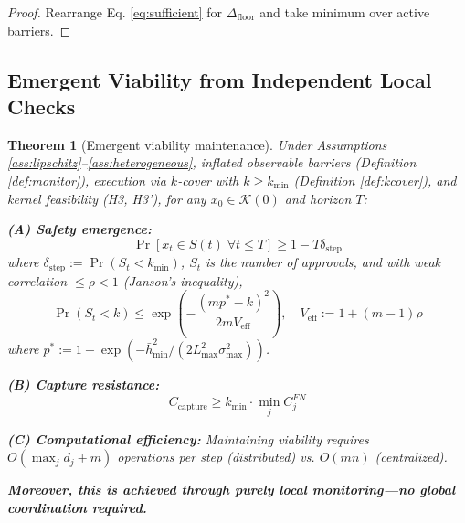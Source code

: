 \documentclass[11pt,a4paper]{article}
\newtheorem{theorem}{Theorem}[section]
\theoremstyle{definition}
\newcommand{\K}{\mathcal{K}}
\begin{document}
\begin{proof}
Rearrange Eq. \eqref{eq:sufficient} for $\Delta_{\text{floor}}$ and take minimum over active barriers.
\end{proof}

\subsection{Emergent Viability from Independent Local Checks}

\begin{theorem}[Emergent viability maintenance]\label{thm:emergence}
Under Assumptions \ref{ass:lipschitz}--\ref{ass:heterogeneous}, inflated observable barriers (Definition \ref{def:monitor}), execution via $k$-cover with $k \geq k_{\min}$ (Definition \ref{def:kcover}), and kernel feasibility (H3, H3'), for any $x_0 \in \K(0)$ and horizon $T$:

\textbf{(A) Safety emergence:}
\begin{equation}
\Pr[x_t \in S(t) \;\forall t \leq T] \geq 1 - T\delta_{\text{step}}
\end{equation}
where $\delta_{\text{step}} := \Pr(S_t < k_{\min})$, $S_t$ is the number of approvals, and with weak correlation $\leq \rho < 1$ (Janson's inequality),
\begin{equation}
\Pr(S_t < k) \leq \exp\left(-\frac{(mp^* - k)^2}{2mV_{\text{eff}}}\right), \quad V_{\text{eff}} := 1 + (m-1)\rho
\end{equation}
where $p^* := 1 - \exp(-\bar{h}_{\min}^2/(2L_{\max}^2 \sigma_{\max}^2))$.

\textbf{(B) Capture resistance:}
\begin{equation}
C_{\text{capture}} \geq k_{\min} \cdot \min_j C_j^{FN}
\end{equation}

\textbf{(C) Computational efficiency:} Maintaining viability requires $O(\max_j d_j + m)$ operations per step (distributed) vs. $O(mn)$ (centralized).

\textbf{Moreover, this is achieved through purely local monitoring---no global coordination required.}
\end{theorem}
\end{document}
